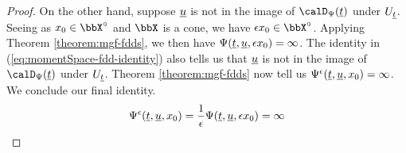 \begin{proof}
  On the other hand, suppose $\underline{u}$ is not in the image of $\momentSpace(\underline t)$ under $U_{\underline t}$.
  Seeing as $\stateVar_0 \in \stateSpace^\circ$ and $\stateSpace$ is a cone, we have $\epsilon\stateVar_0 \in \stateSpace^\circ$.
  Applying Theorem \ref{theorem:mgf-fdds}, we then have $\Psi(\underline t, \underline{u}, \epsilon x_0) = \infty$.
  The identity in (\ref{eq:momentSpace-fdd-identity}) also tells us that $\underline{u}$ is not in the image of $\momentSpace(\underline t)$ under $U_{\underline t}$.
  Theorem \ref{theorem:mgf-fdds} now tell us $\Psi^\epsilon(\underline t, \underline{u}, x_0) = \infty$.
  We conclude our final identity.
  \begin{equation*}
    \Psi^\epsilon(\underline t, \underline{u}, x_0) = \frac1\epsilon \Psi(\underline t, \underline{u}, \epsilon x_0) = \infty
  \end{equation*}
\end{proof}
